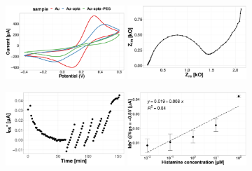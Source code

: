 \begin{figure}
    \centering
    \includegraphics[width = 0.4\textwidth]{figures/chapter4/histamine/CV_functionalization.pdf}
    \quad
    \includegraphics[width = 0.4\textwidth]{figures/chapter4/histamine/EIS_functionalization_gold.pdf}
    \caption{}
    \label{fig:CVfunctionalization}
\end{figure}

\begin{figure}
    \centering
    \includegraphics[width = 0.4\textwidth]{figures/chapter4/histamine/correctedPlot-transfers.pdf}
    \quad
    \includegraphics[width = 0.4\textwidth]{figures/chapter4/histamine/calibrationPlot-transfers.pdf}
    \caption{}
    \label{fig:HisTransfers}
\end{figure}


